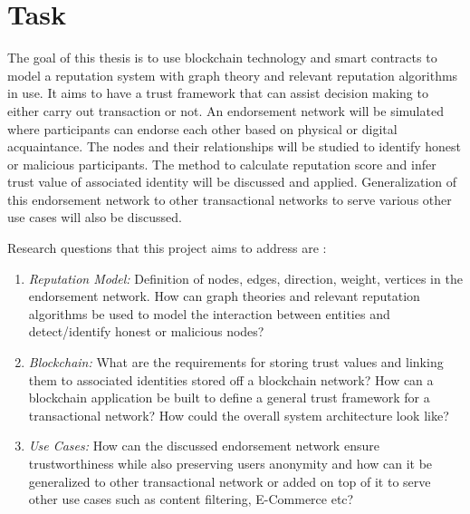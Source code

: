 \documentclass[a4paper,11pt,dvipsnames]{article}
\begin{document}
	\section*{Task}
	The goal of this thesis is to use blockchain technology and smart contracts 
	to model a reputation system with graph theory and relevant reputation 
	algorithms in use. It aims to have a trust framework that can assist 
	decision making to either carry out transaction or not.
	An endorsement network will be simulated where participants can endorse 
	each other based on physical or digital acquaintance. The nodes and 
	their relationships will be studied to identify honest or malicious 
	participants. The method to calculate reputation score and infer trust 
	value of associated identity will be discussed and applied. Generalization 
	of this endorsement network to other transactional networks to serve 
	various other use cases will also be discussed. 

	Research questions that this project aims to address are : 
	\begin{enumerate}
	  \item \textit{Reputation Model:} Definition of nodes, edges, direction, 
		  weight, vertices in the endorsement network. How can graph theories 
		  and relevant reputation algorithms be used to model the 
		  interaction between entities and detect/identify honest or malicious 
		  nodes? 

		\item \textit{Blockchain:} What are the requirements for storing trust 
			values and linking them to associated identities stored off a
			blockchain network? How can a blockchain application be built to 
			define a general trust framework for a transactional network? How 
			could the overall system architecture look like? 


		\item \textit{Use Cases:} How can the discussed endorsement network 
			ensure trustworthiness while also preserving users anonymity and 
			how can it be generalized to other transactional network or added 
			on top of it to serve other use cases such as content filtering, 
			E-Commerce etc? 
	\end{enumerate}
	
\end{document}
